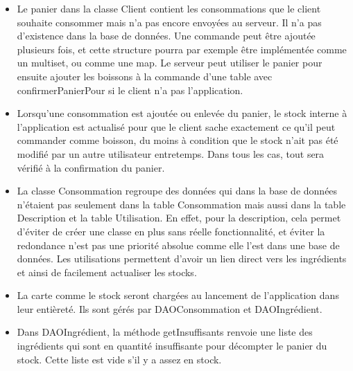 \documentclass[a4paper,10pt]{article}
\begin{document}
\begin{itemize}
    \item Le panier dans la classe Client contient les consommations que le client souhaite consommer mais n'a pas encore envoyées au serveur. Il n'a pas d'existence dans la base de données. Une commande peut être ajoutée plusieurs fois, et cette structure pourra par exemple être implémentée comme un multiset, ou comme une map. Le serveur peut utiliser le panier pour ensuite ajouter les boissons à la commande d'une table avec confirmerPanierPour si le client n'a pas l'application.
    \item Lorsqu'une consommation est ajoutée ou enlevée du panier, le stock interne à l'application est actualisé pour que le client sache exactement ce qu'il peut commander comme boisson, du moins à condition que le stock n'ait pas été modifié par un autre utilisateur entretemps. Dans tous les cas, tout sera vérifié à la confirmation du panier.
    \item La classe Consommation regroupe des données qui dans la base de données n'étaient pas seulement dans la table Consommation mais aussi dans la table Description et la table Utilisation. En effet, pour la description, cela permet d'éviter de créer une classe en plus sans réelle fonctionnalité, et éviter la redondance n'est pas une priorité absolue comme elle l'est dans une base de données. Les utilisations permettent d'avoir un lien direct vers les ingrédients et ainsi de facilement actualiser les stocks.
    \item La carte comme le stock seront chargées au lancement de l'application dans leur entièreté. Ils sont gérés par DAOConsommation et DAOIngrédient.
    \item Dans DAOIngrédient, la méthode getInsuffisants renvoie une liste des ingrédients qui sont en quantité insuffisante pour décompter le panier du stock. Cette liste est vide s'il y a assez en stock.
\end{itemize}
\end{document}
